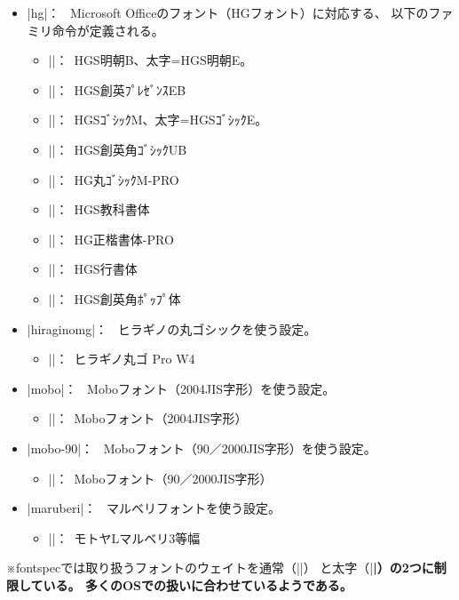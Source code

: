 \documentclass[xelatex,ja=standard,a4paper]{bxjsarticle}
\newcommand{\Pkg}[1]{\textsf{#1}}
\newcommand{\Note}{\par\noindent ※}
\newcommand{\Means}{：\ }
\begin{document}
\begin{itemize}
\item |hg|\Means
Microsoft Officeのフォント（HGフォント）に対応する、
以下のファミリ命令が定義される。
\begin{itemize}
\item |\hgmcfamily|\Means HGS明朝B、太字=HGS明朝E。
\item |\hgprfamily|\Means HGS創英ﾌﾟﾚｾﾞﾝｽEB
\item |\hggtfamily|\Means HGSｺﾞｼｯｸM、太字=HGSｺﾞｼｯｸE。
\item |\hggufamily|\Means HGS創英角ｺﾞｼｯｸUB
\item |\hgmgfamily|\Means HG丸ｺﾞｼｯｸM-PRO
\item |\hgkkfamily|\Means HGS教科書体
\item |\hgksfamily|\Means HG正楷書体-PRO
\item |\hggsfamily|\Means HGS行書体
\item |\hgppfamily|\Means HGS創英角ﾎﾟｯﾌﾟ体
\end{itemize}

\item |hiraginomg|\Means
ヒラギノの丸ゴシックを使う設定。
\begin{itemize}
\item |\hmgfamily|\Means ヒラギノ丸ゴ Pro W4
\end{itemize}

\item |mobo|\Means
Moboフォント（2004JIS字形）を使う設定。
\begin{itemize}
\item |\mobofamily|\Means Moboフォント（2004JIS字形）
\end{itemize}

\item |mobo-90|\Means
Moboフォント（90／2000JIS字形）を使う設定。
\begin{itemize}
\item |\mobofamily|\Means Moboフォント（90／2000JIS字形）
\end{itemize}

\item |maruberi|\Means
マルベリフォントを使う設定。
\begin{itemize}
\item |\mmgfamily|\Means モトヤLマルベリ3等幅
\end{itemize}
\end{itemize}
\Note \Pkg{fontspec}では取り扱うフォントのウェイトを通常（|\mdseries|）
と太字（|\bfseries|）の2つに制限している。
多くのOSでの扱いに合わせているようである。
\end{document}
